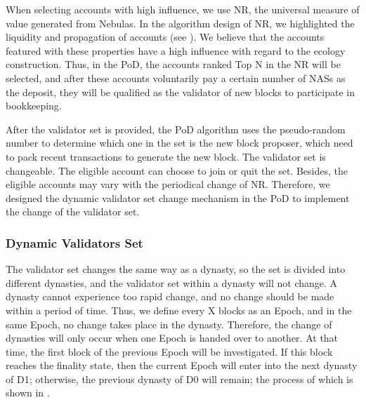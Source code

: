 
When selecting accounts with high influence, we use NR, the universal measure of value generated from Nebulas. In the algorithm design of NR, we highlighted the liquidity and propagation of accounts (see ). We believe that the accounts featured with these properties have a high influence with regard to the ecology construction. Thus, in the PoD, the accounts ranked Top N in the NR will be selected, and after these accounts voluntarily pay a certain number of NASs as the deposit, they will be qualified as the validator of new blocks to participate in bookkeeping.


After the validator set is provided, the PoD algorithm uses the pseudo-random number to determine which one in the set is the new block proposer, which need to pack recent transactions to generate the new block. The validator set is changeable. The eligible account can choose to join or quit the set. Besides, the eligible accounts may vary with the periodical change of NR. Therefore, we designed the dynamic validator set change mechanism in the PoD to implement the change of the validator set.


\subsubsection{Dynamic Validators Set}
\label{pod:design:validators}

The validator set changes the same way as a dynasty, so the set is divided into different dynasties, and the validator set within a dynasty will not change. A dynasty cannot experience too rapid change, and no change should be made within a period of time. Thus, we define every X blocks as an Epoch, and in the same Epoch, no change takes place in the dynasty. Therefore, the change of dynasties will only occur when one Epoch is handed over to another. At that time, the first block of the previous Epoch will be investigated. If this block reaches the finality state, then the current Epoch will enter into the next dynasty of D1; otherwise, the previous dynasty of D0 will remain; the process of which is shown in .

